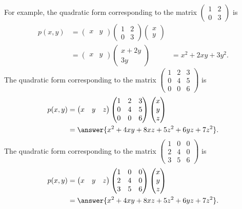 \documentclass{ximera}
\begin{document}
\begin{example}
For example, the quadratic form corresponding to the matrix $\begin{pmatrix}1 & 2\\ 0 & 3\end{pmatrix}$ is
\begin{align*}
p(x,y) &= \begin{pmatrix} x & y\end{pmatrix}\begin{pmatrix}1 & 2\\ 0 & 3\end{pmatrix}\begin{pmatrix} x \\ y\end{pmatrix}\\
&= \begin{pmatrix} x & y\end{pmatrix}\begin{pmatrix} x+2y \\ 3y\end{pmatrix}
&= x^2+2xy+3y^2.
\end{align*}
The quadratic form corresponding to the matrix $\begin{pmatrix}1 & 2 & 3\\0 & 4 & 5\\0 & 0 & 6\end{pmatrix}$ is
\begin{align*}
p(x,y) &= \begin{pmatrix} x & y & z\end{pmatrix}\begin{pmatrix}1 & 2 & 3\\0 & 4 & 5\\0 & 0 & 6\end{pmatrix}\begin{pmatrix} x \\ y\\ z\end{pmatrix}\\
&= \answer{x^2+4xy+8xz+5z^2+6yz+7z^2}.
\end{align*}
The quadratic form corresponding to the matrix $\begin{pmatrix}1 & 0 & 0\\2 & 4 & 0\\3 & 5 & 6\end{pmatrix}$ is
\begin{align*}
p(x,y) &= \begin{pmatrix} x & y & z\end{pmatrix}\begin{pmatrix}1 & 0 & 0\\2 & 4 & 0\\3 & 5 & 6\end{pmatrix}\begin{pmatrix} x \\ y\\ z\end{pmatrix}\\
&= \answer{x^2+4xy+8xz+5z^2+6yz+7z^2}.
\end{align*}
\end{example}
\end{document}
